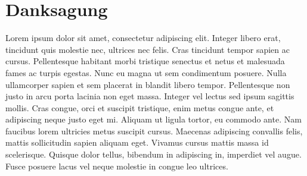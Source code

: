 \section*{Danksagung}

Lorem ipsum dolor sit amet, consectetur adipiscing elit. Integer libero erat, tincidunt quis molestie nec, ultrices nec felis. Cras tincidunt tempor sapien ac cursus. Pellentesque habitant morbi tristique senectus et netus et malesuada fames ac turpis egestas. Nunc eu magna ut sem condimentum posuere. Nulla ullamcorper sapien et sem placerat in blandit libero tempor. Pellentesque non justo in arcu porta lacinia non eget massa. Integer vel lectus sed ipsum sagittis mollis. Cras congue, orci et suscipit tristique, enim metus congue ante, et adipiscing neque justo eget mi. Aliquam ut ligula tortor, eu commodo ante. Nam faucibus lorem ultricies metus suscipit cursus. Maecenas adipiscing convallis felis, mattis sollicitudin sapien aliquam eget. Vivamus cursus mattis massa id scelerisque. Quisque dolor tellus, bibendum in adipiscing in, imperdiet vel augue. Fusce posuere lacus vel neque molestie in congue leo ultrices.